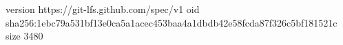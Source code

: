 version https://git-lfs.github.com/spec/v1
oid sha256:1ebc79a531bf13e0ca5a1acec453baa4a1dbdb42e58fcda87f326c5bf181521c
size 3480
